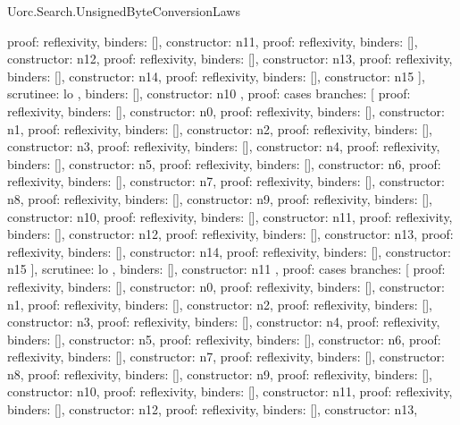 \begin{lexlean}{Uorc.Search.UnsignedByteConversionLaws}
\begin{semanticmodule}
{{{{            {proof: reflexivity{}, binders: [], constructor: n11},
            {proof: reflexivity{}, binders: [], constructor: n12},
            {proof: reflexivity{}, binders: [], constructor: n13},
            {proof: reflexivity{}, binders: [], constructor: n14},
            {proof: reflexivity{}, binders: [], constructor: n15}
          ],
          scrutinee: lo
        },
        binders: [],
        constructor: n10
      },
      {
        proof: cases{
          branches: [
            {proof: reflexivity{}, binders: [], constructor: n0},
            {proof: reflexivity{}, binders: [], constructor: n1},
            {proof: reflexivity{}, binders: [], constructor: n2},
            {proof: reflexivity{}, binders: [], constructor: n3},
            {proof: reflexivity{}, binders: [], constructor: n4},
            {proof: reflexivity{}, binders: [], constructor: n5},
            {proof: reflexivity{}, binders: [], constructor: n6},
            {proof: reflexivity{}, binders: [], constructor: n7},
            {proof: reflexivity{}, binders: [], constructor: n8},
            {proof: reflexivity{}, binders: [], constructor: n9},
            {proof: reflexivity{}, binders: [], constructor: n10},
            {proof: reflexivity{}, binders: [], constructor: n11},
            {proof: reflexivity{}, binders: [], constructor: n12},
            {proof: reflexivity{}, binders: [], constructor: n13},
            {proof: reflexivity{}, binders: [], constructor: n14},
            {proof: reflexivity{}, binders: [], constructor: n15}
          ],
          scrutinee: lo
        },
        binders: [],
        constructor: n11
      },
      {
        proof: cases{
          branches: [
            {proof: reflexivity{}, binders: [], constructor: n0},
            {proof: reflexivity{}, binders: [], constructor: n1},
            {proof: reflexivity{}, binders: [], constructor: n2},
            {proof: reflexivity{}, binders: [], constructor: n3},
            {proof: reflexivity{}, binders: [], constructor: n4},
            {proof: reflexivity{}, binders: [], constructor: n5},
            {proof: reflexivity{}, binders: [], constructor: n6},
            {proof: reflexivity{}, binders: [], constructor: n7},
            {proof: reflexivity{}, binders: [], constructor: n8},
            {proof: reflexivity{}, binders: [], constructor: n9},
            {proof: reflexivity{}, binders: [], constructor: n10},
            {proof: reflexivity{}, binders: [], constructor: n11},
            {proof: reflexivity{}, binders: [], constructor: n12},
            {proof: reflexivity{}, binders: [], constructor: n13},
}}}}
\end{semanticmodule}
\end{lexlean}
